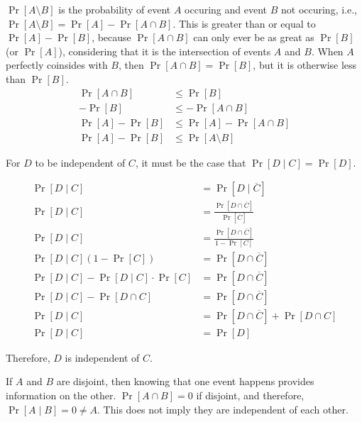 \documentclass[11pt]{article}
\begin{document}
\begin{solution}

\begin{Parts}

\Part $\Pr[A \setminus B]$ is the probability of event $A$ occuring and event 
$B$ not occuring, i.e., $\Pr[A \setminus B] = \Pr[A] - \Pr[A \cap B]$. This is 
greater than or equal to $\Pr[A] - \Pr[B]$, because $\Pr[A \cap B]$ can
only ever be as great as $\Pr[B]$ (or $\Pr[A]$), considering that it is
the intersection of events $A$ and $B$. When $A$ perfectly coinsides with $B$, 
then $\Pr[A \cap B] = \Pr[B]$, but it is otherwise less than $\Pr[B]$.
\[
    \begin{split}
        \Pr[A \cap B] &\leq \Pr[B] \\
        -\Pr[B] &\leq -\Pr[A \cap B] \\
        \Pr[A] - \Pr[B] &\leq \Pr[A] -\Pr[A \cap B] \\
        \Pr[A] - \Pr[B] &\leq \Pr[A \setminus B] 
    \end{split}
\]

\Part For $D$ to be independent of $C$, it must be the case that $\Pr[D \mid C]
= \Pr[D]$. 

\[
    \begin{split}
        \Pr[D \mid C] &= \Pr[D \mid \overline{C}] \\
        \Pr[D \mid C] &= \frac{\Pr[D \cap \overline{C}]}{\Pr[\overline{C}]} \\
        \Pr[D \mid C] &= \frac{\Pr[D \cap \overline{C}]}{1-\Pr[C]} \\
        \Pr[D \mid C](1-\Pr[C]) &= \Pr[D \cap \overline{C}] \\
        \Pr[D \mid C]-\Pr[D \mid C] \cdot \Pr[C] &= \Pr[D \cap \overline{C}] \\
        \Pr[D \mid C]-\Pr[D \cap C] &= \Pr[D \cap \overline{C}] \\
        \Pr[D \mid C] &= \Pr[D \cap \overline{C}] + \Pr[D \cap C]\\
        \Pr[D \mid C] &= \Pr[D]
    \end{split}
\]

Therefore, $D$ is independent of $C$. 

\Part If $A$ and $B$ are disjoint, then knowing that one event happens provides
information on the other. $\Pr[A \cap B] = 0$ if disjoint, and therefore, 
$\Pr[A \mid B] = 0 \neq A$. This does not imply they are independent of each
other. 

\end{Parts}

\end{solution}
\end{document}
